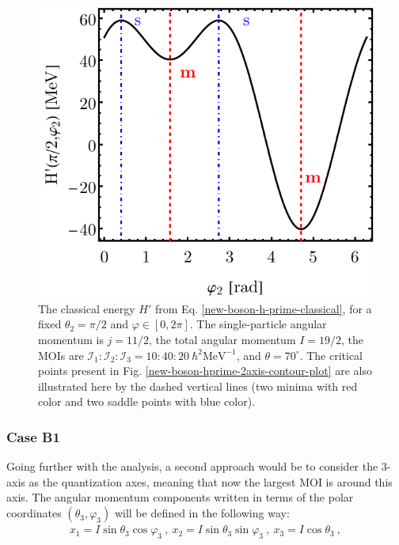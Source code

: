 \begin{figure}
    \begin{center}
        \includegraphics[scale=0.8]{Chapters/Figures/New-Boson-Classical-H-2-axis-varphi-plot.pdf}
        \caption{The classical energy $H'$ from Eq. \ref{new-boson-h-prime-classical}, for a fixed $\theta_2=\pi/2$ and $\varphi\in[0,2\pi]$. The single-particle angular momentum is $j=11/2$, the total angular momentum $I=19/2$, the MOIs are $\mathcal{I}_1:\mathcal{I}_2:\mathcal{I}_3=10:40:20\ \hbar^2\text{MeV}^{-1}$, and $\theta=70^\circ$. The critical points present in Fig. \ref{new-boson-hprime-2axis-contour-plot} are also illustrated here by the dashed vertical lines (two minima with red color and two saddle points with blue color).}
        \label{new-boson-hprime-2axis-varphi-plot}
    \end{center}
\end{figure}

\subsubsection*{Case B1}

Going further with the analysis, a second approach would be to consider the $3$-axis as the quantization axes, meaning that now the largest MOI is around this axis. The angular momentum components written in terms of the polar coordinates $(\theta_3,\varphi_3)$ will be defined in the following way:
\begin{align}
    x_1=I\sin\theta_3\cos\varphi_3\ ,\ x_2=I\sin\theta_3\sin\varphi_3\ ,\ x_3=I\cos\theta_3\ ,
    \label{polar-coordinates-case-b1}
\end{align}

